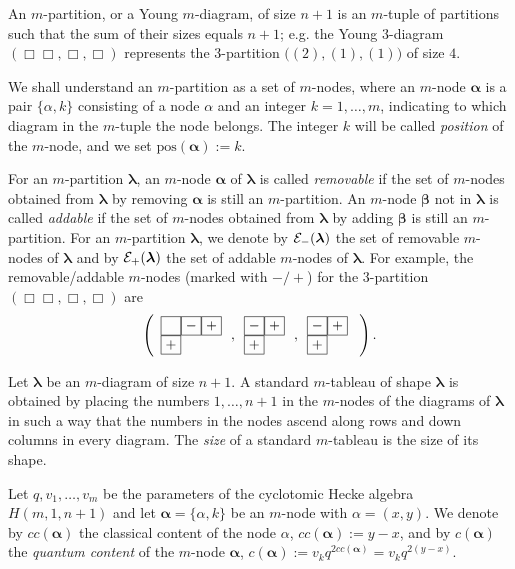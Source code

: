\documentclass[11pt]{article}
\newcommand{\pos}{{\mathrm{pos}}}
\newcommand{\cc}{cc}
\newcommand{\lam}{\boldsymbol{\lambda}}
\newcommand{\alm}{\boldsymbol{\alpha}}
\newcommand{\bem}{\boldsymbol{\beta}}
\begin{document}
An $m$-partition, or a Young $m$-diagram, of size $n+1$ is an $m$-tuple of partitions such that the sum of their sizes equals $n+1$;  e.g.
the Young $3$-diagram $\left(\Box\!\Box,\Box,\Box\right)$ represents the $3$-partition $\bigl((2),(1),(1)\bigr)$ of size $4$.


We shall understand an $m$-partition as a set of $m$-nodes, where an $m$-node $\alm$ is a pair
$\{\alpha,k\}$ consisting of a node $\alpha$ and an integer $k=1,\dots,m$, indicating to which diagram in the $m$-tuple the node belongs. The integer $k$ will be called {\it position}
of the $m$-node, and we set $\pos(\alm):=k$.



For an $m$-partition $\lam$, an $m$-node $\alm$ of $\lam$ is called {\it removable} if the set of $m$-nodes obtained from $\lam$ by removing $\alm$ is still an $m$-partition. An $m$-node $\bem$ not in $\lam$ is called {\it  addable} if the set of $m$-nodes obtained from $\lam$ by adding $\bem$ is still an $m$-partition. For an $m$-partition $\lam$, we denote by
${\cal{E}}_-(\lam)$ the set of removable $m$-nodes of $\lam$ and by ${\cal{E}}_+(\lam)$ the set of addable $m$-nodes of
$\lam$.
For example, the removable/addable $m$-nodes (marked with $-/+$) for the $3$-partition $\left(\Box\!\Box,\Box,\Box\right)$
are
\[
\left(\begin{array}{l}\fbox{$\phantom{-}$}\fbox{$-$}\fbox{$+$}\\ \fbox{$+$}\end{array}
\, ,\begin{array}{l}\fbox{$-$}\fbox{$+$}\\ \fbox{$+$}\end{array}\, ,\begin{array}{l}\fbox{$-$}\fbox{$+$}\\ \fbox{$+$}\end{array}\ \right).
\]


Let $\lam$ be an $m$-diagram of size $n+1$. A standard $m$-tableau of shape $\lam$ is obtained by placing the numbers $1,\dots,n+1$ in the $m$-nodes of the diagrams of $\lam$ in such a way that the numbers in the nodes ascend along rows and down columns in every diagram.
The \emph{size} of a standard $m$-tableau is the size of its shape.


Let $q,v_1,\dots,v_m$ be the parameters of the cyclotomic Hecke algebra $H(m,1,n+1)$ and let $\alm=\{\alpha,k\}$
be an $m$-node with $\alpha=(x,y)$.
We denote by $\cc(\alm)$ the classical content of the node $\alpha$, $\cc(\alm):=y-x$, and by $c(\alm)$ the {\it quantum content} of the $m$-node $\alm$,  $c(\alm):=v_kq^{2\cc(\alm)}=v_kq^{2(y-x)}$.
\end{document}
